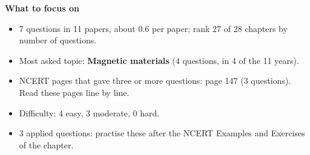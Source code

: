 \begin{minipage}[t]{0.63\linewidth}{\small\textbf{\color{crimson}What to focus on}\par\smallskip
\begin{itemize}[leftmargin=1.1em,itemsep=1pt,topsep=0pt]
\item 7 questions in 11 papers, about 0.6 per paper; rank 27 of 28 chapters by number of questions.
\item Most asked topic: \textbf{Magnetic materials} (4 questions, in 4 of the 11 years).
\item NCERT pages that gave three or more questions: page 147 (3 questions). Read these pages line by line.
\item Difficulty: 4 easy, 3 moderate, 0 hard.
\item 3 applied questions: practise these after the NCERT Examples and Exercises of the chapter.
\end{itemize}}\end{minipage}\par
{}
